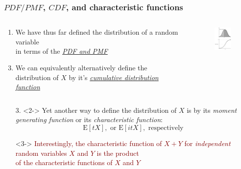 \documentclass[xcolor={dvipsnames}]{beamer}
\begin{document}
 \frame
{
 \frametitle{$PDF/PMF$, $CDF$, and characteristic functions} %

\begin{columns}
\begin{column}{.6\textwidth}

\begin{enumerate}
\item We have thus far defined the distribution of a random variable\\ 
in terms of the \underline{\emph{PDF and PMF}} %
\item[]
\item We can equivalently alternatively define the distribution of $X$ by it's \underline{\emph{cumulative distribution function}} %
\item[]
\end{enumerate}
\end{column}
\begin{column}{.4\textwidth}
\begin{figure}
\vspace{-2em}
\hspace{-4.5em}\includegraphics[width=1.25in]{stuff/pdfCDF.png}
\end{figure}
\end{column}
\end{columns}


\begin{itemize}
\item[3.]<2-> \textcolor{NavyBlue}{Yet another way to define the distribution of $X$ is by its 
\emph{moment generating function} or its \emph{characteristic function}: 
$$\text{E}\left[tX\right], \text{ or } \text{E}\left[itX\right], \text{ respectively}$$}
\vspace{-1em}
\item[]<3-> \textcolor{Maroon}{Interestingly, the characteristic function of $X + Y$
for \emph{independent} random variables $X$ and $Y$ is the product \\ of the characteristic functions of $X$ and $Y$}
\end{itemize}
}
\end{document}
